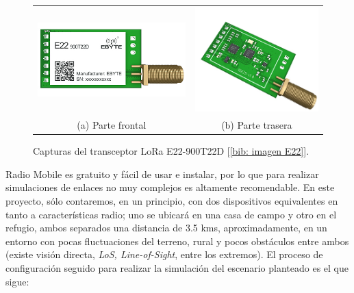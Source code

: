 \documentclass[12pt]{article}
\begin{document}
	\begin{figure}[h!]
		\begin{center}
			\begin{tabular}{cc}
				\includegraphics[width=60mm]{img/e22_front.png} &   \includegraphics[width=50mm]{img/e22_rear.png} \\
				(a) Parte frontal & (b) Parte trasera\\[6pt]
			\end{tabular}
			\caption{Capturas del transceptor LoRa E22-900T22D [\ref{bib: imagen E22}].}
			\label{fig: capturas E22.}
		\end{center}
	\end{figure}

	\pagebreak 
	
	\noindent Radio Mobile es gratuito y fácil de usar e instalar, por lo que para realizar simulaciones de enlaces no muy complejos es altamente recomendable. En este proyecto, sólo contaremos, en un principio, con dos dispositivos equivalentes en tanto a características radio; uno se ubicará en una casa de campo y otro en el refugio, ambos separados una distancia de 3.5 kms, aproximadamente, en un entorno con pocas fluctuaciones del terreno, rural y pocos obstáculos entre ambos (existe visión directa, \textit{LoS, Line-of-Sight}, entre los extremos). El proceso de configuración seguido para realizar la simulación del escenario planteado es el que sigue: 
	
\end{document}
